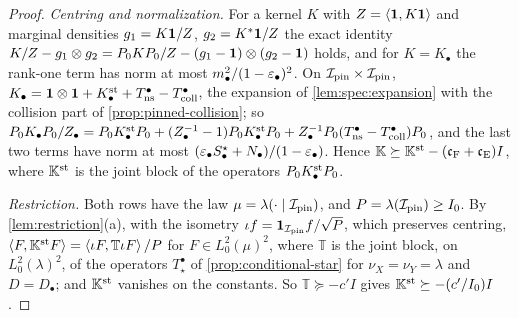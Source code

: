 \begin{proof}
\emph{Centring and normalization.} For a kernel $K$ with $Z=\left\langle \mathbf 1,K\mathbf 1\right\rangle$ and
marginal densities $g_1=K\mathbf 1/Z$, $g_2=K^*\mathbf 1/Z$ the exact identity
$K/Z-g_1\otimes g_2=P_0KP_0/Z-(g_1-\mathbf 1)\otimes(g_2-\mathbf 1)$ holds, and for $K=K_\bullet$
the rank-one term has norm at most $m_\bullet^2/(1-\varepsilon_\bullet)^2$. On
$\mathcal I_{\rm pin}\times\mathcal I_{\rm pin}$,
$K_\bullet=\mathbf 1\otimes\mathbf 1+K^{\rm st}_\bullet+T^\bullet_{\rm ns}-T^\bullet_{\rm coll}$,
the expansion of \cref{lem:spec:expansion} with the collision part of
\cref{prop:pinned-collision}; so
$P_0K_\bullet P_0/Z_\bullet=P_0K^{\rm st}_\bullet P_0+(Z_\bullet^{-1}-1)P_0K^{\rm st}_\bullet
P_0+Z_\bullet^{-1}P_0(T^\bullet_{\rm ns}-T^\bullet_{\rm coll})P_0$, and the last two terms
have norm at most $(\varepsilon_\bullet S^\star_\bullet+N_\bullet)/(1-\varepsilon_\bullet)$. Hence
$\mathbb K\succeq\mathbb K^{\rm st}-(\mathfrak c_{\rm F}+\mathfrak c_{\rm E})I$, where
$\mathbb K^{\rm st}$ is the joint block of the operators $P_0K^{\rm st}_\bullet P_0$.

\emph{Restriction.} Both rows have the law $\mu=\lambda(\cdot\mid\mathcal I_{\rm pin})$,
and $P=\lambda(\mathcal I_{\rm pin})\ge I_0$. By \cref{lem:restriction}(a), with the
isometry $\iota f=\mathbf 1_{\mathcal I_{\rm pin}}f/\sqrt P$, which preserves centring,
$\left\langle F,\mathbb K^{\rm st}F\right\rangle=\left\langle \iota F,\mathbb T\iota F\right\rangle/P$ for $F\in L^2_0(\mu)^2$,
where $\mathbb T$ is the joint block, on $L^2_0(\lambda)^2$, of the operators
$T^\bullet_\star$ of \cref{prop:conditional-star} for $\nu_X=\nu_Y=\lambda$ and
$D=D_\bullet$; and $\mathbb K^{\rm st}$ vanishes on the constants. So
$\mathbb T\succeq-c'I$ gives $\mathbb K^{\rm st}\succeq-(c'/I_0)I$.


\end{proof}

